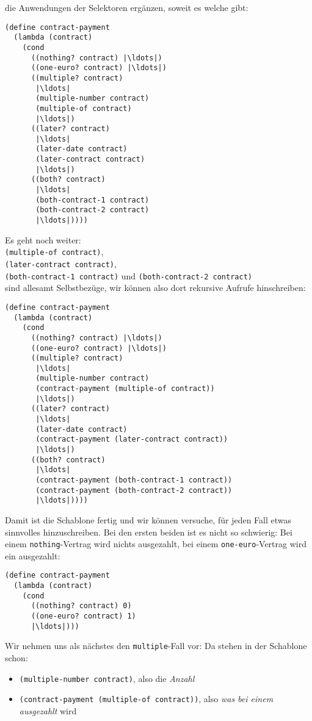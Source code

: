 die Anwendungen der Selektoren ergänzen, soweit es welche gibt:
%
\begin{lstlisting}
(define contract-payment
  (lambda (contract)
    (cond
      ((nothing? contract) |\ldots|)
      ((one-euro? contract) |\ldots|)
      ((multiple? contract)
       |\ldots|
       (multiple-number contract)
       (multiple-of contract)
       |\ldots|)
      ((later? contract)
       |\ldots|
       (later-date contract)
       (later-contract contract)
       |\ldots|)
      ((both? contract)
       |\ldots|
       (both-contract-1 contract)
       (both-contract-2 contract)
       |\ldots|))))
\end{lstlisting}
%
Es geht noch weiter:\\
\lstinline{(multiple-of contract)},\\
\lstinline{(later-contract contract)},\\
\lstinline{(both-contract-1 contract)}  und \lstinline{(both-contract-2 contract)} \\
sind allesamt
Selbstbezüge, wir können also dort rekursive Aufrufe hinschreiben:
%
\begin{lstlisting}
(define contract-payment
  (lambda (contract)
    (cond
      ((nothing? contract) |\ldots|)
      ((one-euro? contract) |\ldots|)
      ((multiple? contract)
       |\ldots|
       (multiple-number contract)
       (contract-payment (multiple-of contract))
       |\ldots|)
      ((later? contract)
       |\ldots|
       (later-date contract)
       (contract-payment (later-contract contract))
       |\ldots|)
      ((both? contract)
       |\ldots|
       (contract-payment (both-contract-1 contract))
       (contract-payment (both-contract-2 contract))
       |\ldots|))))
\end{lstlisting}
%
Damit ist die Schablone fertig und wir können versuche, für jeden Fall
etwas sinnvolles hinzuschreiben.  Bei den ersten beiden ist es nicht
so schwierig: Bei einem \lstinline{nothing}-Vertrag wird nichts
ausgezahlt, bei einem \lstinline{one-euro}-Vertrag wird ein 
ausgezahlt:
%
\begin{lstlisting}
(define contract-payment
  (lambda (contract)
    (cond
      ((nothing? contract) 0)
      ((one-euro? contract) 1)
      |\ldots|)))
\end{lstlisting}
%
Wir nehmen uns als nächstes den \lstinline{multiple}-Fall vor: Da
stehen in der Schablone schon:
\begin{itemize}
\item\lstinline{(multiple-number contract)}, also die \emph{Anzahl}
\item\lstinline{(contract-payment (multiple-of contract))}, also
  \emph{was bei einem ausgezahlt} wird
\end{itemize}

